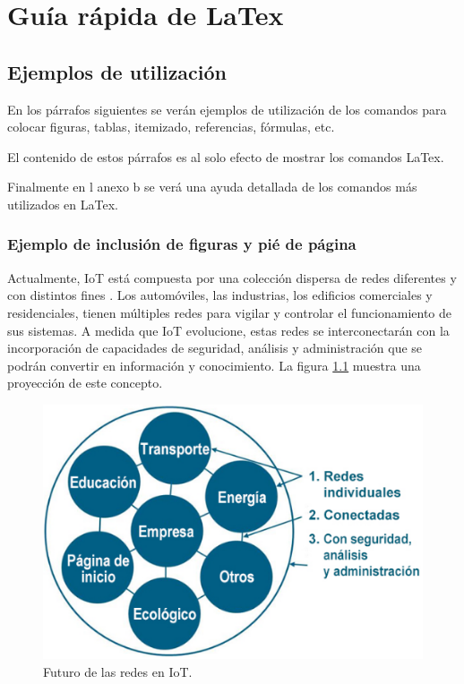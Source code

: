 

\chapter{Guía rápida de LaTex} %

\label{AppendixA} %

\section{Ejemplos de utilización}
\label{intro}
En los párrafos siguientes se verán ejemplos de utilización de los comandos para colocar figuras, tablas, itemizado, referencias, fórmulas, etc.

El contenido de estos párrafos es al solo efecto de mostrar los comandos LaTex.

Finalmente en l anexo b se verá una ayuda detallada de los comandos más utilizados en LaTex.

\subsection{Ejemplo de inclusión de figuras y pié de página}

Actualmente, IoT está compuesta por una colección dispersa de redes diferentes y con distintos fines \citep{cisco}. Los automóviles, las industrias, los edificios comerciales y residenciales, tienen múltiples redes para vigilar y controlar el funcionamiento de sus sistemas. A medida que IoT evolucione, estas redes se interconectarán con la incorporación de capacidades de seguridad, análisis y administración que se podrán convertir en información y conocimiento. La figura \ref{fig:iotcisco} muestra una proyección de este concepto.

\begin{figure}[htbp]
	\centering
	\includegraphics[width=.7\textwidth]{./Figures/iotcisco.png}
	\caption{Futuro de las redes en IoT\protect\footnotemark.}
	\label{fig:iotcisco}
\end{figure}
\vspace{1cm}


